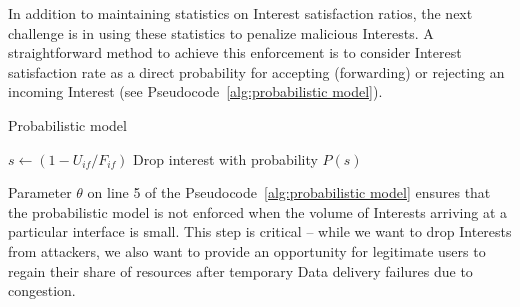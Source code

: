 
In addition to maintaining statistics on Interest satisfaction ratios, the next challenge is in using these statistics to penalize malicious Interests. A straightforward method to achieve this enforcement is to consider Interest satisfaction rate as a direct probability for accepting (forwarding) or rejecting an incoming Interest (see Pseudocode~\ref{alg:probabilistic model}).




\begin{algorithm}[h]
\caption{Probabilistic model}
\label{alg:probabilistic model}
\begin{algorithmic}[1]
\State{} 

\vspace{0.2cm}

    \State{} 
    \State{} 
    
     
        \State $s \leftarrow (1 - U_{if} / F_{if})$
        \State Drop interest with probability $P(s)$
    \EndIf

\EndFunction

\end{algorithmic}
\end{algorithm}

Parameter $\theta$ on line 5 of the Pseudocode~\ref{alg:probabilistic model} ensures that the probabilistic model is not enforced when the volume of Interests arriving at a particular interface is small.
This step is critical -- while we want to drop Interests from attackers, we also want to provide an opportunity for legitimate users to regain their share of resources after temporary Data delivery failures due to  congestion.


